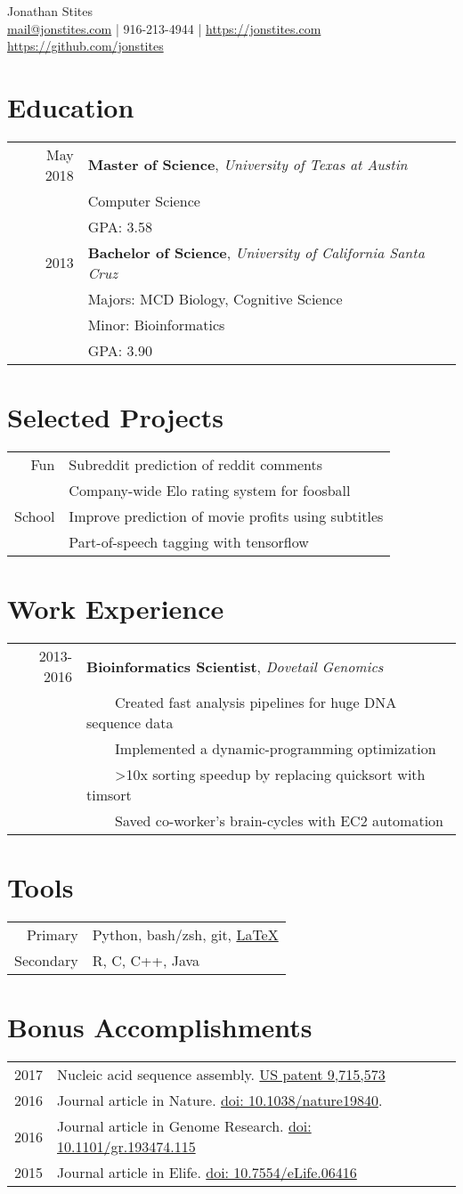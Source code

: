 \documentclass[12pt]{extarticle}
\makeatletter
\newcommand{\tabitem}{~~\llap{\textbullet}~~}
\newcommand*{\email}{
	\href{mailto:mail+resume@jonstites.com}{mail@jonstites.com}
	}
\newcommand*{\phone}{
	916-213-4944
	}
\newcommand*{\github}{
	{\href{https://github.com/jonstites}{https://github.com/jonstites}}
}
\newcommand*{\website}{
	{\href{https://jonstites.com}{https://jonstites.com}}
}
\newcommand*{\Contact}{
	\begin{center}
		\Huge Jonathan Stites \\
		\small \email| \phone | \website \\
	    \github
	\end{center}
}
\newcommand*{\Education}{
	\section{Education}
	\begin{tabular}{rl}
		May 2018  & \textbf{Master of Science}, \textit{University of Texas at Austin} \\
				  & Computer Science \\
          		  & GPA: 3.58 \\
		2013 	  & \textbf{Bachelor of Science}, \textit{University of California Santa Cruz} \\
				  & Majors: MCD Biology, Cognitive Science \\
		  		  & Minor: Bioinformatics \\
				  & GPA: 3.90 \\
\end{tabular}
}
\newcommand*{\Projects}{
	\section{Selected Projects}
	\begin{tabular}{rl}
	Fun & Subreddit prediction of reddit comments \\
		& Company-wide Elo rating system for foosball \\
	School & Improve prediction of movie profits using subtitles\\
           & Part-of-speech tagging with tensorflow \\
	\end{tabular}
}
\newcommand*{\Tools}{
	\section{Tools}
	\begin{tabular}{rl}
	Primary   & Python, bash/zsh, git, 
			  \href{http://stevehanov.ca/blog/resume_comic.png}{\LaTeX} \\
	Secondary & R, C, C++, Java \\
	\end{tabular}
}
\newcommand*{\Work}{
	\section{Work Experience}
	\begin{tabular}{rl}
	2013-2016 & \textbf{Bioinformatics Scientist}, 
			    \textit{Dovetail Genomics} \\
	   & \tabitem Created fast analysis pipelines for huge DNA sequence data \\
	   & \tabitem Implemented a dynamic-programming optimization \\
	   & \tabitem >10x sorting speedup by replacing quicksort with timsort \\
	   & \tabitem Saved co-worker's brain-cycles with EC2 automation \\

	\end{tabular}
}
\newcommand*{\Bonus}{
	\section{Bonus Accomplishments}
	\begin{tabular}{rl}
	2017 & Nucleic acid sequence assembly.
	\href{https://patents.google.com/patent/US9715573B2}
	{US patent 9,715,573} \\
	2016 & 
	Journal article in Nature.
	\href{https://www.ncbi.nlm.nih.gov/pubmed/27762356}
	{doi: 10.1038/nature19840}. \\
	2016 & 
	Journal article in Genome Research.
	\href{https://www.ncbi.nlm.nih.gov/pubmed/26848124}
	{doi: 10.1101/gr.193474.115} \\
	2015 & 
	Journal article in Elife.
	\href{https://www.ncbi.nlm.nih.gov/pubmed/25919952}
	{doi: 10.7554/eLife.06416}
	\end{tabular}
}
\makeatother
\begin{document}
\Contact
\Education
\Projects
\Work
\Tools
\Bonus
\end{document}
